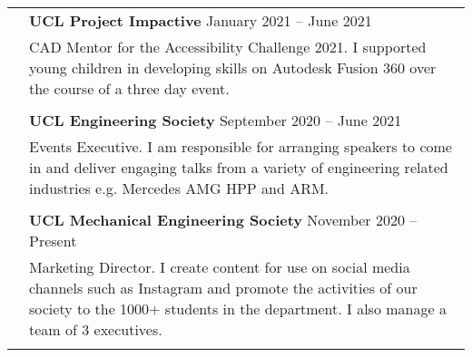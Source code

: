 \documentclass[letterpaper, 11pt]{article}
\begin{document}
\begin{longtable}{p{1.3in}p{4.8in}}

    \color{OliveGreen}{Service and outreach}
     & \textbf{UCL Project Impactive} \hfill January 2021 -- June 2021                                                                                                                                                    \\
     & CAD Mentor for the Accessibility Challenge 2021. I supported young children in developing skills on Autodesk Fusion 360 over the course of a three day event.                                                      \\
     &                                                                                                                                                                                                                    \\

     & \textbf{UCL Engineering Society} \hfill September 2020 -- June 2021                                                                                                                                                \\
     & Events Executive. I am responsible for arranging speakers to come in and deliver engaging talks from a variety of engineering related industries e.g. Mercedes AMG HPP and ARM.                                    \\
     &                                                                                                                                                                                                                    \\

     & \textbf{UCL Mechanical Engineering Society} \hfill November 2020 -- Present                                                                                                                                        \\
     & Marketing Director. I create content for use on social media channels such as Instagram and promote the activities of our society to the 1000+ students in the department. I also manage a team of 3 executives.   \\
     &                                                                                                                                                                                                                    \\


\end{longtable}
\end{document}
